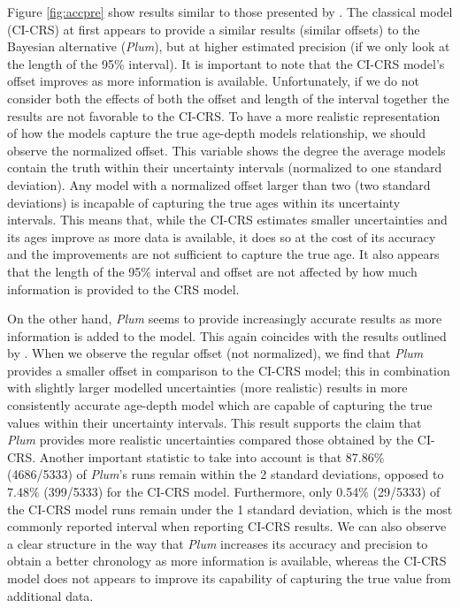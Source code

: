 \documentclass [10pt] {article}
\begin{document}
Figure \ref{fig:accpre} show results similar to those presented by \citet{Blaauw2018}. 
The classical model (CI-CRS) at first appears to provide a similar results (similar offsets) to the Bayesian alternative (\textit{Plum}), but at higher estimated precision (if we only look at the length of the 95\% interval). 
It is important to note that the CI-CRS model's offset improves as more information is available.
Unfortunately, if we do not consider both the effects of both the offset and length of the interval together the results are not favorable to the CI-CRS. 
To have a more realistic representation of how the models capture the true age-depth models relationship, we should observe the normalized offset. 
This variable shows the degree the average models contain the truth within their uncertainty intervals (normalized to one standard deviation). 
Any model with a normalized offset larger than two (two standard deviations) is incapable of capturing the true ages within its uncertainty intervals.  
This means that, while the CI-CRS estimates smaller uncertainties and its ages improve as more data is available, it does so at the cost of its accuracy and the improvements are not sufficient to capture the true age.
It also appears that the length of the 95\% interval and offset are not affected by how much information is provided to the CRS model. 

On the other hand, \textit{Plum} seems to provide increasingly accurate results as more information is added to the model.
This again coincides with the results outlined by \citet{Blaauw2018}. 
When we observe the regular offset (not normalized), we find that \textit{Plum} provides a smaller offset in comparison to the CI-CRS model; this in combination with slightly larger modelled uncertainties (more realistic) results in more consistently accurate age-depth model which are capable of capturing the true values within their uncertainty intervals. 
This result supports the claim that \textit{Plum} provides more realistic uncertainties compared those obtained by the CI-CRS. 
Another important statistic to take into account is that 87.86\% (4686/5333) of \textit{Plum}'s runs remain within the 2 standard deviations, opposed to 7.48\% (399/5333) for the CI-CRS model. Furthermore, only 0.54\% (29/5333) of the CI-CRS model runs remain under the 1 standard deviation, which is the most commonly reported interval when reporting CI-CRS results.
We can also observe a clear structure in the way that \textit{Plum} increases its accuracy and precision to obtain a better chronology as more information is available, whereas the CI-CRS model does not appears to improve its capability of capturing the true value from additional data. 
\end{document}
